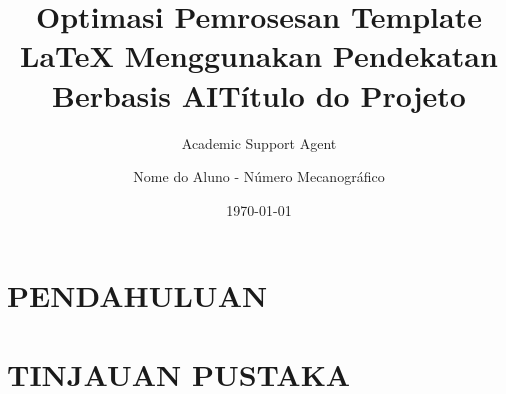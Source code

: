\documentclass{ipb}
\title{Optimasi Pemrosesan Template LaTeX Menggunakan Pendekatan Berbasis AI}
\author{Academic Support Agent}
\date{\today}
\begin{document}
\maketitle

\begin{abstract}

\end{abstract}

\chapter{PENDAHULUAN}


\chapter{TINJAUAN PUSTAKA}



\usepackage{projei}

\usepackage[portuguese]{babel}
\graphicspath{{./images/}}
\usepackage{listings} %
\usepackage{url} %
\usepackage[colorlinks=true,
                    urlcolor=black, %
                    linkcolor=black,
                    citecolor=black, %
                    bookmarks=true,
                    pdfstartview=FitH]{hyperref}

\usepackage[style=ieee,backend=biber]{biblatex}


\usepackage{lipsum}

\usepackage{tabulary}


\title{Título do Projeto}

\author{Nome do Aluno - Número Mecanográfico}




\makeglossaries
{}


\usepackage{etoolbox}
\end{document}
